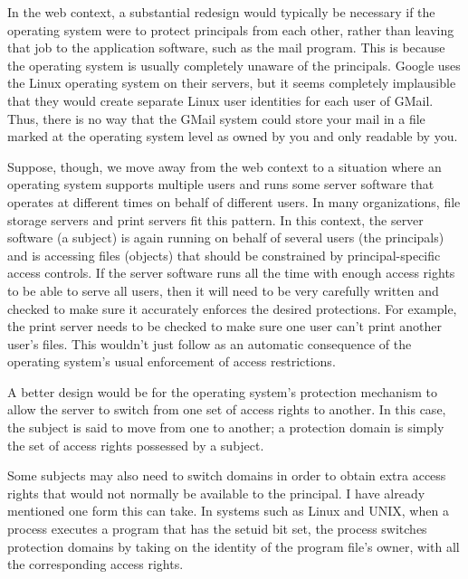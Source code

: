 In the web context, a substantial redesign would typically be
necessary if the operating system were to protect principals from each
other, rather than leaving that job to the application software, such
as the mail program.  This is because the operating system is usually
completely unaware of the principals.  Google uses the Linux operating
system on their servers, but it seems completely implausible that they
would create separate Linux user identities for each user of GMail.
Thus, there is no way that the GMail system could store your mail in a
file marked at the operating system level as owned by you and only
readable by you.

Suppose, though, we move away from the web context to a situation
where an operating system supports multiple users and runs some server
software that operates at different times on behalf of different
users.  In many organizations, file storage servers and print servers
fit this pattern.  In this context, the server software (a subject) is
again running on behalf of several users (the principals) and is
accessing files (objects) that should be constrained by
principal-specific access controls.  If the server software runs all
the time with enough access rights to be able to serve all users, then
it will need to be very carefully written and checked to make sure it
accurately enforces the desired protections.  For example, the print
server needs to be checked to make sure one user can't print another
user's files.  This wouldn't just follow as an automatic consequence
of the operating system's usual enforcement of access restrictions.

A better design would be for the operating system's protection mechanism
to allow the server to switch from one set of access rights to
another.  In this case, the subject is said to move from one
 to another; a protection domain is
simply the set of access rights possessed by a subject.

Some subjects may also need to switch domains in order to obtain extra
access rights that would not normally be available to the principal.
I have already mentioned one form this can take.  In systems such as
Linux and UNIX, when a process executes a program that has the setuid
bit set, the process switches protection domains by taking on the
identity of the program file's owner, with all the corresponding
access rights.

